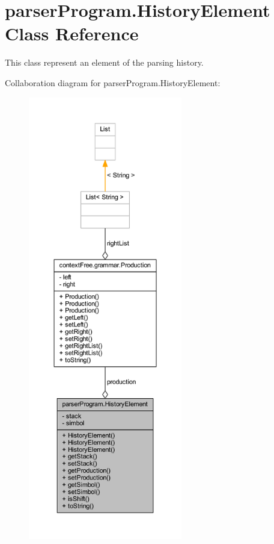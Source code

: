\hypertarget{classparser_program_1_1_history_element}{\section{parser\-Program.\-History\-Element Class Reference}
\label{classparser_program_1_1_history_element}
}


This class represent an element of the parsing history.  




Collaboration diagram for parser\-Program.\-History\-Element\-:\nopagebreak
\begin{figure}[H]
\begin{center}
\leavevmode
\includegraphics[height=550pt]{classparser_program_1_1_history_element__coll__graph}
\end{center}
\end{figure}
